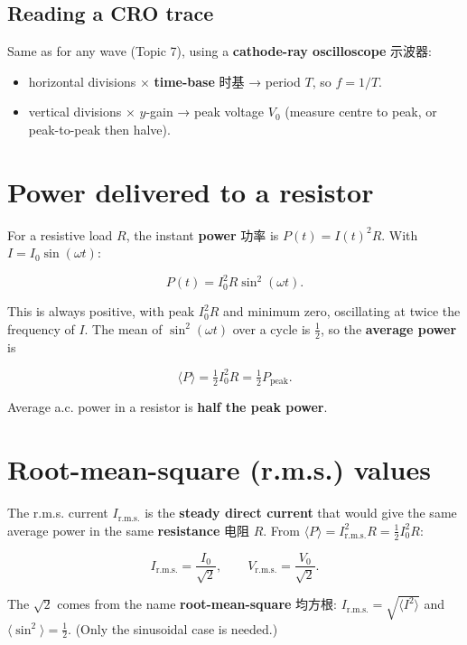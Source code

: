 \documentclass[11pt]{article}
\begin{document}
\subsection*{Reading a CRO trace}

Same as for any wave (Topic 7), using a \textbf{cathode-ray oscilloscope} 示波器:

\begin{itemize}
\item horizontal divisions × \textbf{time-base} 时基 → period $T$, so $f = 1/T$.

\item vertical divisions × $y$-gain → peak voltage $V_{0}$ (measure centre to peak, or peak-to-peak then halve).

\end{itemize}

\section*{Power delivered to a resistor}

For a resistive load $R$, the instant \textbf{power} 功率 is $P(t) = I(t)^{2} R$. With $I = I_{0}\sin(\omega t)$:

\[
P(t) = I_{0}^{2} R \sin^{2}(\omega t).
\]

This is always positive, with peak $I_{0}^{2} R$ and minimum zero, oscillating at twice the frequency of $I$. The mean of $\sin^{2}(\omega t)$ over a cycle is $\tfrac{1}{2}$, so the \textbf{average power} is

\[
\langle P \rangle = \tfrac{1}{2} I_{0}^{2} R = \tfrac{1}{2} P_{\text{peak}}.
\]

Average a.c. power in a resistor is \textbf{half the peak power}.

\section*{Root-mean-square (r.m.s.) values}

The r.m.s. current $I_{\text{r.m.s.}}$ is the \textbf{steady direct current} that would give the same average power in the same \textbf{resistance} 电阻 $R$. From $\langle P \rangle = I_{\text{r.m.s.}}^{2} R = \tfrac{1}{2} I_{0}^{2} R$:

\[
I_{\text{r.m.s.}} = \frac{I_{0}}{\sqrt{2}}, \qquad V_{\text{r.m.s.}} = \frac{V_{0}}{\sqrt{2}}.
\]

The $\sqrt{2}$ comes from the name \textbf{root-mean-square} 均方根: $I_{\text{r.m.s.}} = \sqrt{\langle I^{2} \rangle}$ and $\langle \sin^{2}\rangle = \tfrac{1}{2}$. (Only the sinusoidal case is needed.)
\end{document}
